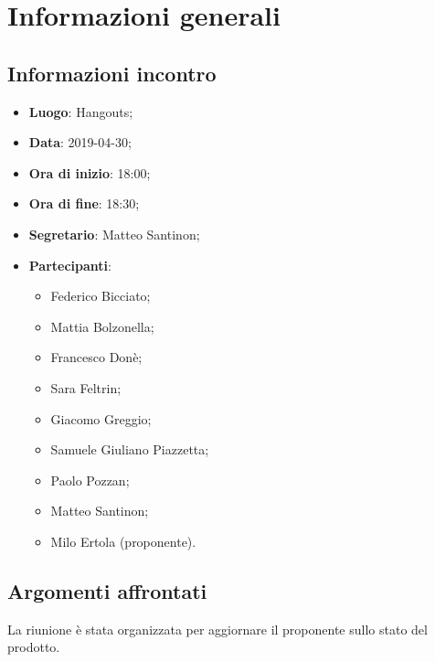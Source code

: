 \section{Informazioni generali}

\subsection{Informazioni incontro}
\begin{itemize}
\item \textbf{Luogo}: Hangouts;
\item \textbf{Data}: 2019-04-30;
\item \textbf{Ora di inizio}: 18:00;
\item \textbf{Ora di fine}: 18:30;
\item \textbf{Segretario}: Matteo Santinon;
\item \textbf{Partecipanti}: 
\begin{itemize}
	\item Federico Bicciato;
	\item Mattia Bolzonella;
	\item Francesco Donè;
	\item Sara Feltrin;
	\item Giacomo Greggio;
	\item Samuele Giuliano Piazzetta;
	\item Paolo Pozzan;
	\item Matteo Santinon;
	\item Milo Ertola (proponente).
\end{itemize}
\end{itemize}

\subsection{Argomenti affrontati}
La riunione è stata organizzata per aggiornare il proponente sullo 
stato del prodotto.
